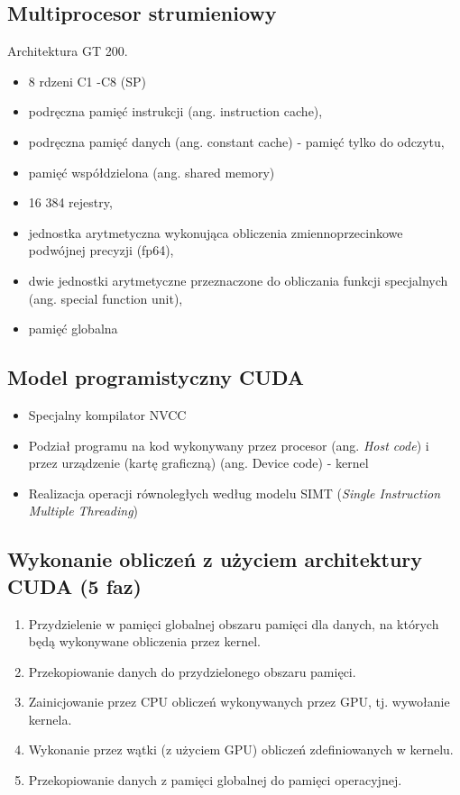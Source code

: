 	\subsection{Multiprocesor strumieniowy}
		Architektura GT 200.
		\begin{itemize}
			\item 8 rdzeni C1 -C8 (SP)
			\item podręczna pamięć instrukcji (ang. instruction cache),
			\item podręczna pamięć danych (ang. constant cache) - pamięć tylko do odczytu,
			\item pamięć współdzielona (ang. shared memory)
			\item 16 384 rejestry,
			\item jednostka arytmetyczna wykonująca obliczenia zmiennoprzecinkowe podwójnej precyzji (fp64),
			\item dwie jednostki arytmetyczne przeznaczone do obliczania funkcji specjalnych (ang. special function unit),
			\item pamięć globalna
		\end{itemize}
	\subsection{Model programistyczny CUDA}
		\begin{itemize}
			\item Specjalny kompilator NVCC
			\item Podział programu na kod wykonywany przez procesor (ang. \emph{Host code}) i przez urządzenie (kartę graficzną) (ang. Device code) - kernel
			\item Realizacja operacji równoległych według modelu SIMT (\emph{Single Instruction Multiple Threading})
		\end{itemize}
	\subsection{Wykonanie obliczeń z użyciem architektury CUDA (5 faz)}
		\begin{enumerate}
			\item Przydzielenie w pamięci globalnej obszaru pamięci dla danych, na których będą wykonywane obliczenia przez kernel.
			\item Przekopiowanie danych do przydzielonego obszaru pamięci.
			\item Zainicjowanie przez CPU obliczeń wykonywanych przez GPU, tj. wywołanie kernela.
			\item Wykonanie przez wątki (z użyciem GPU) obliczeń zdefiniowanych w kernelu.
			\item Przekopiowanie danych z pamięci globalnej do pamięci operacyjnej.
		\end{enumerate}
